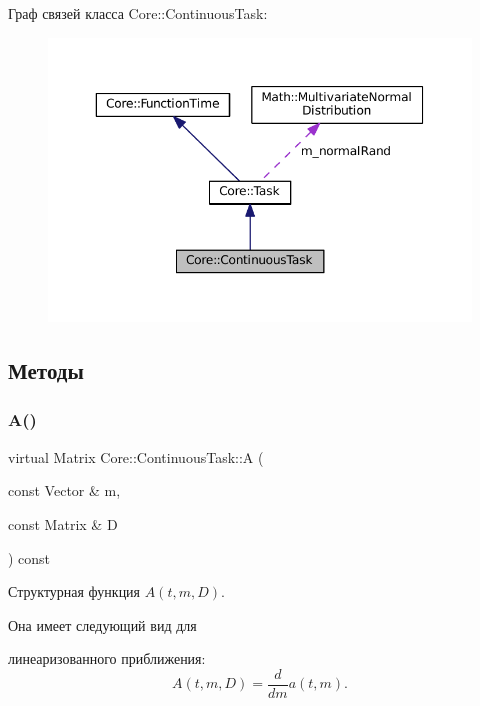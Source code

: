 Граф связей класса Core\+:\+:Continuous\+Task\+:
\nopagebreak
\begin{figure}[H]
\begin{center}
\leavevmode
\includegraphics[width=350pt]{class_core_1_1_continuous_task__coll__graph}
\end{center}
\end{figure}


\subsection{Методы}
\hypertarget{class_core_1_1_continuous_task_a75fbac1abe67223cd7938b724c5cce45}{}\label{class_core_1_1_continuous_task_a75fbac1abe67223cd7938b724c5cce45} 
\subsubsection{\texorpdfstring{A()}{A()}}
{\footnotesize\ttfamily virtual Matrix Core\+::\+Continuous\+Task\+::A (\begin{DoxyParamCaption}\item[{const Vector \&}]{m,  }\item[{const Matrix \&}]{D }\end{DoxyParamCaption}) const\hspace{0.3cm}{\ttfamily [pure virtual]}}



Структурная функция $A(t, m, D)$. 

Она имеет следующий вид для


\begin{DoxyItemize}
\item линеаризованного приближения\+: \[A(t, m, D) = \frac{d}{dm} a(t, m).\] 
\end{DoxyItemize}

